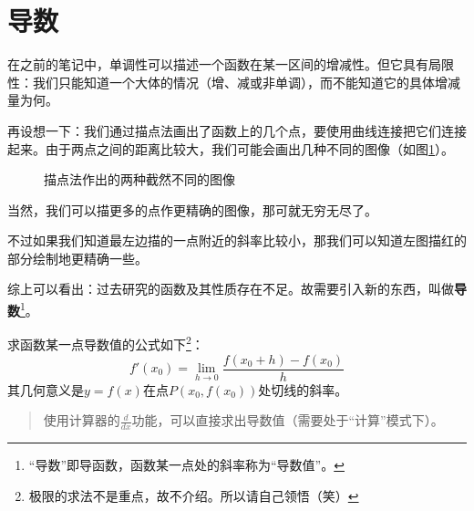\section{导数}
在之前的笔记中，单调性可以描述一个函数在某一区间的增减性。但它具有局限性：我们只能知道一个大体的情况（增、减或非单调），而不能知道它的具体增减量为何。

再设想一下：我们通过描点法画出了函数上的几个点，要使用曲线连接把它们连接起来。由于两点之间的距离比较大，我们可能会画出几种不同的图像（如图\ref{fig:two-different-function-figure}）。

\begin{figure}[htb]
    \centering
    \caption{描点法作出的两种截然不同的图像}
    \label{fig:two-different-function-figure}
\end{figure}

当然，我们可以描更多的点作更精确的图像，那可就无穷无尽了。

不过如果我们知道最左边描的一点附近的斜率比较小，那我们可以知道左图描红的部分绘制地更精确一些。

综上可以看出：过去研究的函数及其性质存在不足。故需要引入新的东西，叫做\textbf{导数}\footnote{“导数”即导函数，函数某一点处的斜率称为“导数值”。}。

求函数某一点导数值的公式如下\footnote{极限的求法不是重点，故不介绍。所以请自己领悟（笑）}：\[f'(x_0)=\lim_{h\rightarrow 0}\frac{f(x_0+h)-f(x_0)}{h}\]其几何意义是$y=f(x)$在点$P(x_0, f(x_0))$处切线的斜率。

\begin{quote}
	使用计算器的$\frac{d}{dx}$功能，可以直接求出导数值（需要处于“计算”模式下）。
\end{quote}

